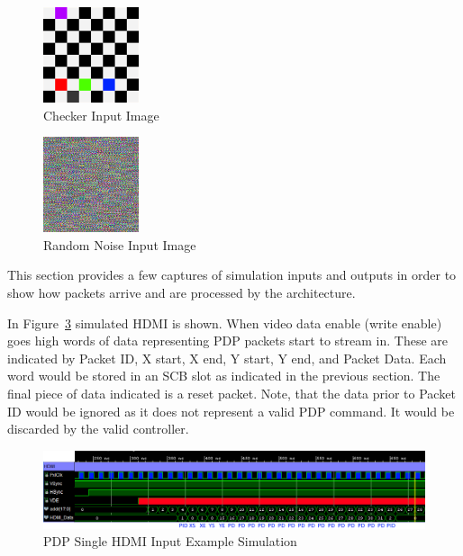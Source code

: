 
\label{chap:experimental_results}
\begin{figure}
    \centering
    \includegraphics[width=0.25\textwidth]{fig/checker.png}
    \caption{Checker Input Image}
    \label{fig:checker_pattern}
\end{figure}

\begin{figure}
    \centering
    \includegraphics[width=0.25\textwidth]{fig/random_noise.png}
    \caption{Random Noise Input Image}
    \label{fig:random_noise}
\end{figure}

This section provides a few captures of simulation inputs and outputs in order to show how packets arrive and are processed by the architecture.

In Figure~\ref{fig:input_example} simulated HDMI is shown. When video data enable (write enable) goes high words of data representing PDP packets start to stream in. These are indicated by Packet ID, X start, X end, Y start, Y end, and Packet Data. Each word would be stored in an SCB slot as indicated in the previous section. The final piece of data indicated is a reset packet. Note, that the data prior to Packet ID would be ignored as it does not represent a valid PDP command. It would be discarded by the valid controller.

\begin{figure}
    \centering
    \includegraphics[width=1.0\textwidth]{fig/pdp_input_example.png}
    \caption{PDP Single HDMI Input Example Simulation}
    \label{fig:input_example}
\end{figure}

